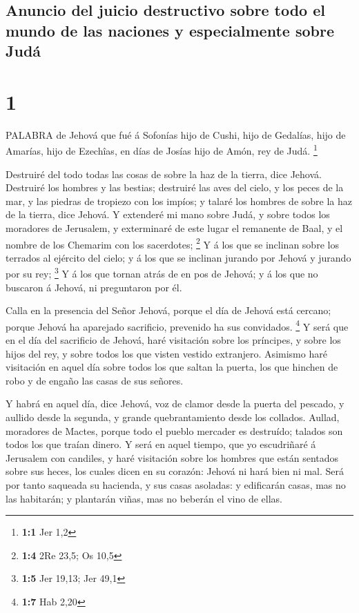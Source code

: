 \hypertarget{anuncio-del-juicio-destructivo-sobre-todo-el-mundo-de-las-naciones-y-especialmente-sobre-juduxe1}{%
\subsection{Anuncio del juicio destructivo sobre todo el mundo de las
naciones y especialmente sobre
Judá}\label{anuncio-del-juicio-destructivo-sobre-todo-el-mundo-de-las-naciones-y-especialmente-sobre-juduxe1}}

\hypertarget{section}{%
\section{1}\label{section}}

 PALABRA de Jehová que fué á Sofonías hijo de Cushi, hijo de
Gedalías, hijo de Amarías, hijo de Ezechîas, en días de Josías hijo de
Amón, rey de Judá. \footnote{\textbf{1:1} Jer 1,2}

 Destruiré del todo todas las cosas de sobre la haz de la
tierra, dice Jehová.  Destruiré los hombres y las bestias;
destruiré las aves del cielo, y los peces de la mar, y las piedras de
tropiezo con los impíos; y talaré los hombres de sobre la haz de la
tierra, dice Jehová.  Y extenderé mi mano sobre Judá, y
sobre todos los moradores de Jerusalem, y exterminaré de este lugar el
remanente de Baal, y el nombre de los Chemarim con los sacerdotes;
\footnote{\textbf{1:4} 2Re 23,5; Os 10,5}  Y á los que se
inclinan sobre los terrados al ejército del cielo; y á los que se
inclinan jurando por Jehová y jurando por su rey; \footnote{\textbf{1:5}
  Jer 19,13; Jer 49,1}  Y á los que tornan atrás de en pos
de Jehová; y á los que no buscaron á Jehová, ni preguntaron por él.

 Calla en la presencia del Señor Jehová, porque el día de
Jehová está cercano; porque Jehová ha aparejado sacrificio, prevenido ha
sus convidados. \footnote{\textbf{1:7} Hab 2,20}  Y será que
en el día del sacrificio de Jehová, haré visitación sobre los príncipes,
y sobre los hijos del rey, y sobre todos los que visten vestido
extranjero.  Asimismo haré visitación en aquel día sobre
todos los que saltan la puerta, los que hinchen de robo y de engaño las
casas de sus señores.

 Y habrá en aquel día, dice Jehová, voz de clamor desde la
puerta del pescado, y aullido desde la segunda, y grande quebrantamiento
desde los collados.  Aullad, moradores de Mactes, porque
todo el pueblo mercader es destruído; talados son todos los que traían
dinero.  Y será en aquel tiempo, que yo escudriñaré á
Jerusalem con candiles, y haré visitación sobre los hombres que están
sentados sobre sus heces, los cuales dicen en su corazón: Jehová ni hará
bien ni mal.  Será por tanto saqueada su hacienda, y sus
casas asoladas: y edificarán casas, mas no las habitarán; y plantarán
viñas, mas no beberán el vino de ellas.

